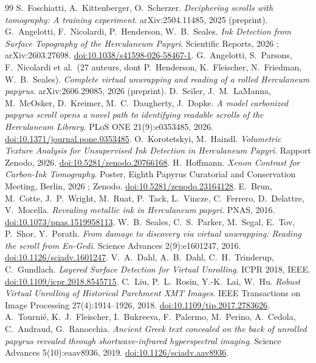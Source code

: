 \documentclass[11pt,a4paper]{article}
\begin{document}
\begin{thebibliography}{99}
 S.~Foschiatti, A.~Kittenberger, O.~Scherzer. \emph{Deciphering scrolls with tomography: A training experiment}. arXiv:2504.11485, 2025 (preprint).
 G.~Angelotti, F.~Nicolardi, P.~Henderson, W.~B.~Seales. \emph{Ink Detection from Surface Topography of the Herculaneum Papyri}. Scientific Reports, 2026 ; arXiv:2603.27698. \href{https://doi.org/10.1038/s41598-026-58467-1}{doi:10.1038/s41598-026-58467-1}.
 G.~Angelotti, S.~Parsons, F.~Nicolardi et al.\ (27 auteurs, dont P.~Henderson, K.~Fleischer, N.~Friedman, W.~B.~Seales). \emph{Complete virtual unwrapping and reading of a rolled Herculaneum papyrus}. arXiv:2606.29085, 2026 (preprint).
 D.~Seiler, J.~M.~LaManna, M.~McOsker, D.~Kreimer, M.~C.~Daugherty, J.~Dopke. \emph{A model carbonized papyrus scroll opens a novel path to identifying readable scrolls of the Herculaneum Library}. PLoS ONE 21(9):e0353485, 2026. \href{https://doi.org/10.1371/journal.pone.0353485}{doi:10.1371/journal.pone.0353485}.
 O.~Korotetskyi, M.~Haindl. \emph{Volumetric Texture Analysis for Unsupervised Ink Detection in Herculaneum Papyri}. Rapport Zenodo, 2026. \href{https://doi.org/10.5281/zenodo.20766168}{doi:10.5281/zenodo.20766168}.
 H.~Hoffmann. \emph{Xenon Contrast for Carbon-Ink Tomography}. Poster, Eighth Papyrus Curatorial and Conservation Meeting, Berlin, 2026 ; Zenodo. \href{https://doi.org/10.5281/zenodo.23164128}{doi:10.5281/zenodo.23164128}.
 E.~Brun, M.~Cotte, J.~P.~Wright, M.~Ruat, P.~Tack, L.~Vincze, C.~Ferrero, D.~Delattre, V.~Mocella. \emph{Revealing metallic ink in Herculaneum papyri}. PNAS, 2016. \href{https://doi.org/10.1073/pnas.1519958113}{doi:10.1073/pnas.1519958113}.
 W.~B.~Seales, C.~S.~Parker, M.~Segal, E.~Tov, P.~Shor, Y.~Porath. \emph{From damage to discovery via virtual unwrapping: Reading the scroll from En-Gedi}. Science Advances 2(9):e1601247, 2016. \href{https://doi.org/10.1126/sciadv.1601247}{doi:10.1126/sciadv.1601247}.
 V.~A.~Dahl, A.~B.~Dahl, C.~H.~Trinderup, C.~Gundlach. \emph{Layered Surface Detection for Virtual Unrolling}. ICPR 2018, IEEE. \href{https://doi.org/10.1109/icpr.2018.8545715}{doi:10.1109/icpr.2018.8545715}.
 C.~Liu, P.~L.~Rosin, Y.-K.~Lai, W.~Hu. \emph{Robust Virtual Unrolling of Historical Parchment XMT Images}. IEEE Transactions on Image Processing 27(4):1914–1926, 2018. \href{https://doi.org/10.1109/tip.2017.2783626}{doi:10.1109/tip.2017.2783626}.
 A.~Tournié, K.~J.~Fleischer, I.~Bukreeva, F.~Palermo, M.~Perino, A.~Cedola, C.~Andraud, G.~Ranocchia. \emph{Ancient Greek text concealed on the back of unrolled papyrus revealed through shortwave-infrared hyperspectral imaging}. Science Advances 5(10):eaav8936, 2019. \href{https://doi.org/10.1126/sciadv.aav8936}{doi:10.1126/sciadv.aav8936}.

\end{thebibliography}
\end{document}
